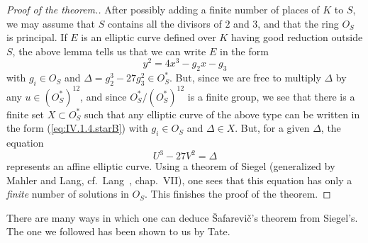 \begin{proof}[Proof of the theorem.]
After possibly adding a finite number of places of $K$ to $S$, we may
assume that $S$ contains all the divisors of $2$ and $3$, and that the
ring $O_S$ is principal.  If $E$ is an elliptic curve defined over $K$
having good reduction outside $S$, the above lemma tells us that we
can write $E$ in the form
\begin{equation}\tag{$*$}\label{eq:IV.1.4.starB}
y^2 = 4x^3 - g_2x - g_3
\end{equation}
with $g_i \in O_S$ and $\Delta = g_2^3 - 27g_3^2 \in O_S^*$.  But,
since we are free to multiply $\Delta$ by any $u \in (O_S^*)^{12}$,
and since $O_S^*/(O_S^*)^{12}$ is a finite group, we see that there is
a finite set $X \subset O_S^*$ such that any elliptic curve of the
above type can be written in the form (\ref{eq:IV.1.4.starB}) with
$g_i \in O_S$ and $\Delta \in X$.  But, for a given $\Delta$, the
equation
\[
U^3 - 27V^2 = \Delta
\]
represents an affine elliptic curve.  Using a theorem of Siegel
(generalized by Mahler and Lang, cf.~Lang~\cite{lang-dio}, chap.~VII),
one sees that this equation has only a \emph{finite} number of
solutions in $O_S$.  This finishes the proof of the theorem.
\end{proof}


There are many ways in which one can deduce \v{S}afarevi\v{c}'s
theorem from Siegel's.  The one we followed has been shown to us by
Tate.
